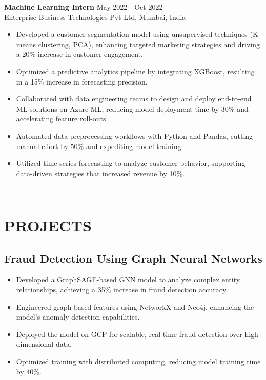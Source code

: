 \documentclass[12pt,a4paper]{article}
\newcommand{\workexp}[4]{
  \textbf{#1} \hfill #2\\
  #3 \hfill #4\\
  \vspace{-1em}
}
\begin{document}
\workexp{Machine Learning Intern}{May 2022 - Oct 2022}{Enterprise Business Technologies Pvt Ltd, Mumbai, India}{
  \begin{itemize}[leftmargin=*,noitemsep,topsep=0pt]
    \item Developed a customer segmentation model using unsupervised techniques (K-means clustering, PCA), enhancing targeted marketing strategies and driving a 20\% increase in customer engagement.
    \item Optimized a predictive analytics pipeline by integrating XGBoost, resulting in a 15\% increase in forecasting precision.
    \item Collaborated with data engineering teams to design and deploy end-to-end ML solutions on Azure ML, reducing model deployment time by 30\% and accelerating feature roll-outs.
    \item Automated data preprocessing workflows with Python and Pandas, cutting manual effort by 50\% and expediting model training.
    \item Utilized time series forecasting to analyze customer behavior, supporting data-driven strategies that increased revenue by 10\%.
  \end{itemize}
}

\section*{PROJECTS}
\subsection*{Fraud Detection Using Graph Neural Networks}
\begin{itemize}[leftmargin=*,noitemsep,topsep=0pt]
  \item Developed a GraphSAGE-based GNN model to analyze complex entity relationships, achieving a 35\% increase in fraud detection accuracy.
  \item Engineered graph-based features using NetworkX and Neo4j, enhancing the model’s anomaly detection capabilities.
  \item Deployed the model on GCP for scalable, real-time fraud detection over high-dimensional data.
  \item Optimized training with distributed computing, reducing model training time by 40\%.
\end{itemize}
\end{document}
